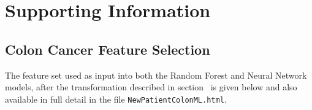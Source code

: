 \documentclass[10pt,letterpaper]{article}
\newcommand{\codewhite}[1]{\colorbox{white}{\texttt{#1}}}
\begin{document}

\section*{Supporting Information}
\label{sec:supporting}

\subsection*{Colon Cancer Feature Selection}
\label{Colon_Cancer_Feature_Selection}


The feature set used as input into both the Random Forest and Neural Network models, after the transformation described in section~ is given below and also available in full detail in the file 
\codewhite{NewPatientColonML.html}.
\end{document}
